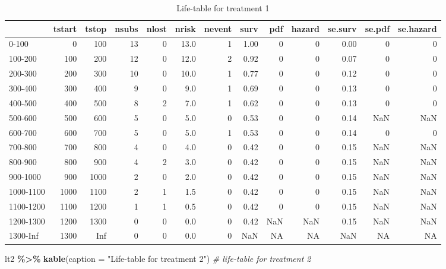 \documentclass[
]{article}
\newenvironment{Shaded}{\begin{snugshade}}{\end{snugshade}}
\newcommand{\AttributeTok}[1]{\textcolor[rgb]{0.13,0.29,0.53}{#1}}
\newcommand{\CommentTok}[1]{\textcolor[rgb]{0.56,0.35,0.01}{\textit{#1}}}
\newcommand{\FunctionTok}[1]{\textcolor[rgb]{0.13,0.29,0.53}{\textbf{#1}}}
\newcommand{\NormalTok}[1]{#1}
\newcommand{\SpecialCharTok}[1]{\textcolor[rgb]{0.81,0.36,0.00}{\textbf{#1}}}
\newcommand{\StringTok}[1]{\textcolor[rgb]{0.31,0.60,0.02}{#1}}
\begin{document}
\begin{table}

\caption{\label{tab:unnamed-chunk-2}Life-table for treatment 1}
\centering
\begin{tabular}[t]{l|r|r|r|r|r|r|r|r|r|r|r|r}
\hline
  & tstart & tstop & nsubs & nlost & nrisk & nevent & surv & pdf & hazard & se.surv & se.pdf & se.hazard\\
\hline
0-100 & 0 & 100 & 13 & 0 & 13.0 & 1 & 1.00 & 0 & 0 & 0.00 & 0 & 0\\
\hline
100-200 & 100 & 200 & 12 & 0 & 12.0 & 2 & 0.92 & 0 & 0 & 0.07 & 0 & 0\\
\hline
200-300 & 200 & 300 & 10 & 0 & 10.0 & 1 & 0.77 & 0 & 0 & 0.12 & 0 & 0\\
\hline
300-400 & 300 & 400 & 9 & 0 & 9.0 & 1 & 0.69 & 0 & 0 & 0.13 & 0 & 0\\
\hline
400-500 & 400 & 500 & 8 & 2 & 7.0 & 1 & 0.62 & 0 & 0 & 0.13 & 0 & 0\\
\hline
500-600 & 500 & 600 & 5 & 0 & 5.0 & 0 & 0.53 & 0 & 0 & 0.14 & NaN & NaN\\
\hline
600-700 & 600 & 700 & 5 & 0 & 5.0 & 1 & 0.53 & 0 & 0 & 0.14 & 0 & 0\\
\hline
700-800 & 700 & 800 & 4 & 0 & 4.0 & 0 & 0.42 & 0 & 0 & 0.15 & NaN & NaN\\
\hline
800-900 & 800 & 900 & 4 & 2 & 3.0 & 0 & 0.42 & 0 & 0 & 0.15 & NaN & NaN\\
\hline
900-1000 & 900 & 1000 & 2 & 0 & 2.0 & 0 & 0.42 & 0 & 0 & 0.15 & NaN & NaN\\
\hline
1000-1100 & 1000 & 1100 & 2 & 1 & 1.5 & 0 & 0.42 & 0 & 0 & 0.15 & NaN & NaN\\
\hline
1100-1200 & 1100 & 1200 & 1 & 1 & 0.5 & 0 & 0.42 & 0 & 0 & 0.15 & NaN & NaN\\
\hline
1200-1300 & 1200 & 1300 & 0 & 0 & 0.0 & 0 & 0.42 & NaN & NaN & 0.15 & NaN & NaN\\
\hline
1300-Inf & 1300 & Inf & 0 & 0 & 0.0 & 0 & NaN & NA & NA & NaN & NA & NA\\
\hline
\end{tabular}
\end{table}

\begin{Shaded}
\begin{Highlighting}[]
\NormalTok{lt2 }\SpecialCharTok{\%\textgreater{}\%} \FunctionTok{kable}\NormalTok{(}\AttributeTok{caption =} \StringTok{"Life{-}table for treatment 2"}\NormalTok{) }\CommentTok{\# life{-}table for treatment 2}
\end{Highlighting}
\end{Shaded}
\end{document}
